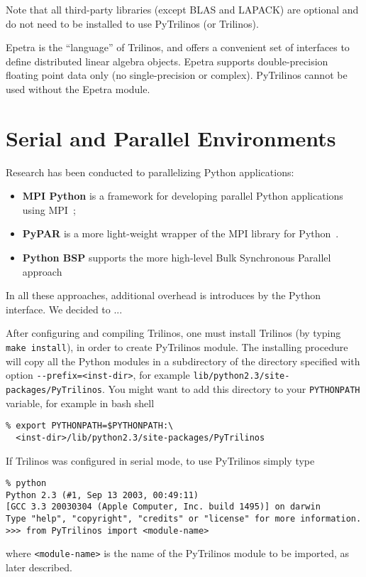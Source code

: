 \documentclass[10pt,relax]{SANDreport}
\begin{document}
Note that all third-party libraries (except BLAS and LAPACK) are optional and
do not need to be installed to use PyTrilinos (or Trilinos).

Epetra is the
``language'' of Trilinos, and offers a convenient set of interfaces to define
distributed linear algebra objects. Epetra supports double-precision floating
point data only (no single-precision or complex). 
PyTrilinos cannot be used without the Epetra module.

\section{Serial and Parallel Environments}
\label{sec:serial}

Research has been conducted to parallelizing Python applications: 
\begin{itemize}
\item {\bf MPI Python} is a framework for developing parallel Python
applications using MPI~\cite{MPI-Python};
\item {\bf PyPAR}  is a more light-weight wrapper of the MPI library for
Python~\cite{pypar}.
\item {\bf Python BSP} supports the more high-level Bulk Synchronous Parallel
approach~\cite{FIXME}
\end{itemize}

In all these approaches, additional overhead is introduces by the Python
interface. We decided to ...



After configuring and compiling Trilinos, one must install Trilinos 
(by typing \verb!make install!), in order to create PyTrilinos module.
The installing procedure will copy all the Python modules in a subdirectory of
the directory specified with option \verb!--prefix=<inst-dir>!, for example
\verb!lib/python2.3/site-packages/PyTrilinos!. You might want to add this
directory to your \verb!PYTHONPATH! variable, for example in bash shell
\begin{verbatim}
% export PYTHONPATH=$PYTHONPATH:\
  <inst-dir>/lib/python2.3/site-packages/PyTrilinos
\end{verbatim}

If Trilinos was configured in serial mode, to use PyTrilinos  simply type
\begin{verbatim}
% python
Python 2.3 (#1, Sep 13 2003, 00:49:11) 
[GCC 3.3 20030304 (Apple Computer, Inc. build 1495)] on darwin
Type "help", "copyright", "credits" or "license" for more information.
>>> from PyTrilinos import <module-name>
\end{verbatim}
where \verb!<module-name>! is the name of the PyTrilinos module to be
imported, as later described.
\end{document}
